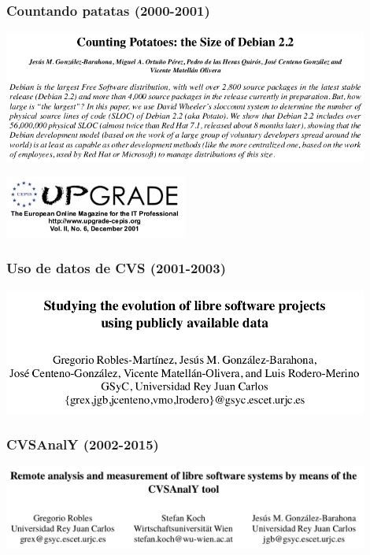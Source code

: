 \begin{frame}[fragile]
  \frametitle{Countando patatas (2000-2001)}

  \begin{center}
  \includegraphics[width=12cm]{figs/counting-potatos}

  \includegraphics[width=6cm]{figs/upgrade}
  \end{center}  
  
\end{frame}

\begin{frame}[fragile]
  \frametitle{Uso de datos de CVS (2001-2003)}

  \begin{center}
  \includegraphics[width=12cm]{figs/evolution-data}
  \end{center}  
  
\end{frame}

\begin{frame}[fragile]
  \frametitle{CVSAnalY (2002-2015)}

  \begin{center}
  \includegraphics[width=12cm]{figs/cvsanaly}
  \end{center}  
  
\end{frame}

